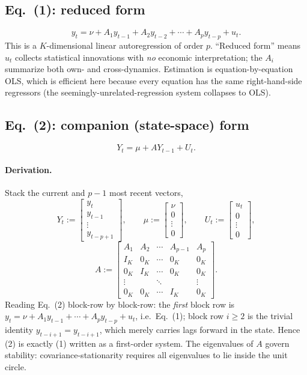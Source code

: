 \documentclass[11pt]{article}
\theoremstyle{remark}
\begin{document}
\subsection*{Eq.~(1): reduced form}
\begin{equation}
y_t = \nu + A_1 y_{t-1} + A_2 y_{t-2} + \cdots + A_p y_{t-p} + u_t. \tag{1}
\end{equation}
This is a $K$-dimensional linear autoregression of order $p$. ``Reduced form''
means $u_t$ collects statistical innovations with \emph{no} economic
interpretation; the $A_i$ summarize both own- and cross-dynamics. Estimation is
equation-by-equation OLS, which is efficient here because every equation has the
same right-hand-side regressors (the seemingly-unrelated-regression system
collapses to OLS).

\subsection*{Eq.~(2): companion (state-space) form}
\begin{equation}
Y_t = \mu + A Y_{t-1} + U_t. \tag{2}
\end{equation}

\paragraph{Derivation.} Stack the current and $p-1$ most recent vectors,
\[
Y_t:=\begin{bmatrix} y_t\\ y_{t-1}\\ \vdots\\ y_{t-p+1}\end{bmatrix},\qquad
\mu:=\begin{bmatrix} \nu\\ 0\\ \vdots\\ 0\end{bmatrix},\qquad
U_t:=\begin{bmatrix} u_t\\ 0\\ \vdots\\ 0\end{bmatrix},
\]
\[
A:=\begin{bmatrix}
A_1 & A_2 & \cdots & A_{p-1} & A_p\\
I_K & 0_K & \cdots & 0_K & 0_K\\
0_K & I_K & \cdots & 0_K & 0_K\\
\vdots & & \ddots & & \vdots\\
0_K & 0_K & \cdots & I_K & 0_K
\end{bmatrix}.
\]
Reading Eq.~(2) block-row by block-row: the \emph{first} block row is
$y_t=\nu+A_1y_{t-1}+\cdots+A_py_{t-p}+u_t$, i.e.\ Eq.~(1); block row $i\ge 2$ is
the trivial identity $y_{t-i+1}=y_{t-i+1}$, which merely carries lags forward in
the state. Hence (2) is exactly (1) written as a first-order system. The
eigenvalues of $A$ govern stability: covariance-stationarity requires all
eigenvalues to lie inside the unit circle.
\end{document}
